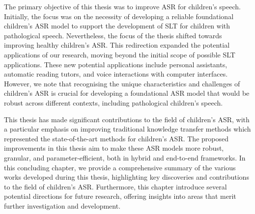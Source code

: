 \label{chap:8}
\cleardoublepage

The primary objective of this thesis was to improve \ac{ASR} for children's speech. Initially, the focus was on the necessity of developing a reliable foundational children's \ac{ASR} model to support the development of \ac{SLT} for children with pathological speech. Nevertheless, the focus of the thesis shifted towards improving healthy children's \ac{ASR}. This redirection expanded the potential applications of our research, moving beyond the initial scope of possible \ac{SLT} applications. These new potential applications include personal assistants, automatic reading tutors, and voice interactions with computer interfaces. However, we note that recognising the unique characteristics and challenges of children's \ac{ASR} is crucial for developing a foundational \ac{ASR} model that would be robust across different contexts, including pathological children's speech.

This thesis has made significant contributions to the field of children's \ac{ASR}, with a particular emphasis on improving traditional knowledge transfer methods which represented the state-of-the-art methods for children's \ac{ASR}. The proposed improvements in this thesis aim to make these \ac{ASR} models more robust, granular, and parameter-efficient, both in hybrid and end-to-end frameworks. In this concluding chapter, we provide a comprehensive summary of the various works developed during this thesis, highlighting key discoveries and contributions to the field of children's \ac{ASR}. Furthermore, this chapter introduce several potential directions for future research, offering insights into areas that merit further investigation and development.

